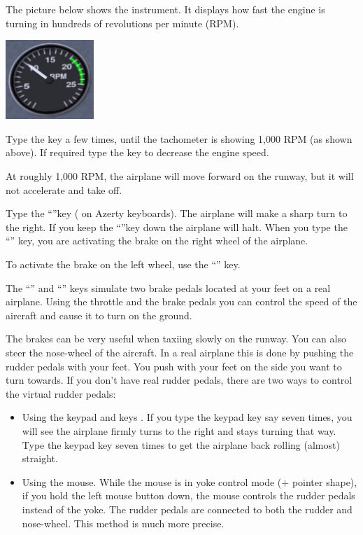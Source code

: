 The picture below shows the  instrument. It displays how fast 
the engine is turning in hundreds of revolutions per minute (RPM).

\begin{center}
\includegraphics[width=0.25\textwidth]{img/tut_20}
\end{center}

Type the  key a few times,
until the tachometer is showing 1,000 RPM (as shown above). If required
type the  key to decrease the engine speed.

At roughly 1,000 RPM, the airplane will move forward on the runway, but it will 
not accelerate and take off.

 Type the ``''key ( on 
Azerty keyboards). The airplane will make a sharp turn to the right. If you 
keep the ``''key down the airplane will halt. When you type the 
``'' key, you are activating the brake on the right wheel of the 
airplane. 

 To activate the brake on the left 
wheel, use the ``\key{,}'' key. 

 The ``\key{,}'' and ``''  keys simulate two brake pedals 
located at your feet on a real airplane. Using the throttle and the brake pedals
you can control the speed of the aircraft and cause it to turn on the ground. 

The brakes can be very useful when taxiing slowly on the runway. You can also
steer the nose-wheel of the aircraft. In a real airplane this is done by pushing
the rudder pedals with your feet. You push with your feet on the side you want 
to turn towards. If you don't have real rudder pedals, there are two ways to 
control the virtual rudder pedals:
\begin{itemize}
	\item Using the keypad   and  keys 
  . If you type the keypad  key say 
  seven times, you will see the airplane firmly turns to the right and 
  stays turning that way. Type the keypad  key seven times to get the 
  airplane back rolling (almost) straight.
	\item Using the mouse. While the mouse is in yoke control mode 
  ($+$ pointer shape), if you hold the left mouse button down, the mouse 
  controls the rudder pedals instead of the yoke. The rudder pedals are 
  connected to both the rudder  
   and nose-wheel. This method is much more precise.
\end{itemize}
 
